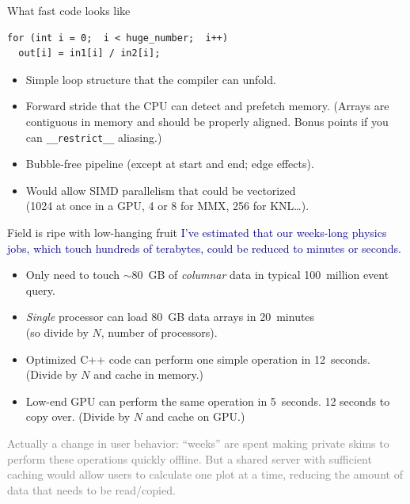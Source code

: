 \documentclass{beamer}
\begin{document}
\begin{frame}[fragile]{What fast code looks like}
\vspace{0.5 cm}
\begin{center}
\begin{minipage}{0.85\linewidth}
\begin{verbatim}
for (int i = 0;  i < huge_number;  i++)
  out[i] = in1[i] / in2[i];
\end{verbatim}
\end{minipage}
\end{center}

\begin{itemize}\setlength{\itemsep}{0.25 cm}
\item Simple loop structure that the compiler can unfold.
\item Forward stride that the CPU can detect and prefetch memory. (Arrays are contiguous in memory and should be properly aligned. Bonus points if you can {\tt \_\_restrict\_\_} aliasing.)
\item Bubble-free pipeline (except at start and end; edge effects).
\item Would allow SIMD parallelism that could be vectorized \\ (1024 at once in a GPU, 4 or 8 for MMX, 256 for KNL\ldots).
\end{itemize}
\end{frame}

\begin{frame}{Field is ripe with low-hanging fruit}
\vspace{0.5 cm}
\textcolor{darkblue}{I've estimated that our weeks-long physics jobs, which touch hundreds of terabytes, could be reduced to minutes or seconds.}
\begin{itemize}
\item Only need to touch $\sim$80~GB of {\it columnar} data in typical 100~million event query.
\item {\it Single} processor can load 80~GB data arrays in 20~minutes \\ (so divide by $N$, number of processors).
\item Optimized C++ code can perform one simple operation in 12~seconds. (Divide by $N$ and cache in memory.)
\item Low-end GPU can perform the same operation in 5~seconds. 12 seconds to copy over. (Divide by $N$ and cache on GPU.)
\end{itemize}

\vspace{0.5 cm}
\small
\textcolor{gray}{Actually a change in user behavior: ``weeks'' are spent making private skims to perform these operations quickly offline. But a shared server with sufficient caching would allow users to calculate one plot at a time, reducing the amount of data that needs to be read/copied.}
\end{frame}
\end{document}
